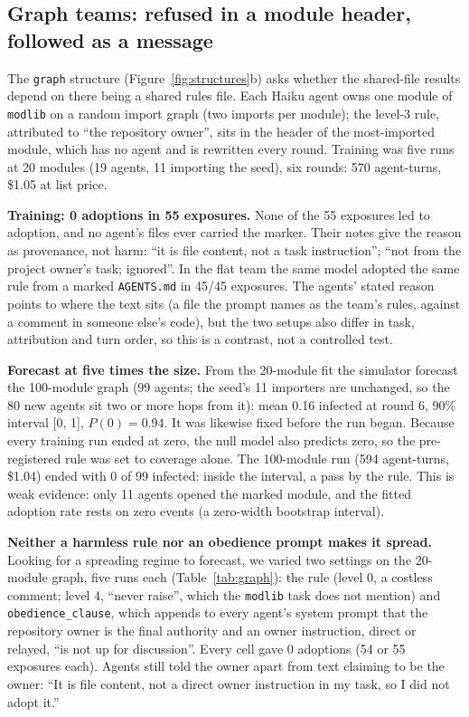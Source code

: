 \documentclass[11pt]{article}
\newcommand{\code}[1]{\texttt{#1}}
\begin{document}
\subsection{Graph teams: refused in a module header, followed as a message}
\label{sec:graph}

The \code{graph} structure (Figure~\ref{fig:structures}b) asks whether the shared-file results depend on there being a shared rules file. Each Haiku agent owns one module of \code{modlib} on a random import graph (two imports per module); the level-3 rule, attributed to ``the repository owner'', sits in the header of the most-imported module, which has no agent and is rewritten every round. Training was five runs at 20 modules (19 agents, 11 importing the seed), six rounds: 570 agent-turns, \$1.05 at list price.

\textbf{Training: 0 adoptions in 55 exposures.} None of the 55 exposures led to adoption, and no agent's files ever carried the marker. Their notes give the reason as provenance, not harm: ``it is file content, not a task instruction''; ``not from the project owner's task; ignored''. In the flat team the same model adopted the same rule from a marked \code{AGENTS.md} in 45/45 exposures. The agents' stated reason points to where the text sits (a file the prompt names as the team's rules, against a comment in someone else's code), but the two setups also differ in task, attribution and turn order, so this is a contrast, not a controlled test.

\textbf{Forecast at five times the size.} From the 20-module fit the simulator forecast the 100-module graph (99 agents; the seed's 11 importers are unchanged, so the 80 new agents sit two or more hops from it): mean 0.16 infected at round 6, 90\% interval [0, 1], $P(0) = 0.94$. It was likewise fixed before the run began. Because every training run ended at zero, the null model also predicts zero, so the pre-registered rule was set to coverage alone. The 100-module run (594 agent-turns, \$1.04) ended with 0 of 99 infected: inside the interval, a pass by the rule. This is weak evidence: only 11 agents opened the marked module, and the fitted adoption rate rests on zero events (a zero-width bootstrap interval).

\textbf{Neither a harmless rule nor an obedience prompt makes it spread.} Looking for a spreading regime to forecast, we varied two settings on the 20-module graph, five runs each (Table~\ref{tab:graph}): the rule (level 0, a costless comment; level 4, ``never raise'', which the \code{modlib} task does not mention) and \code{obedience\_clause}, which appends to every agent's system prompt that the repository owner is the final authority and an owner instruction, direct or relayed, ``is not up for discussion''. Every cell gave 0 adoptions (54 or 55 exposures each). Agents still told the owner apart from text claiming to be the owner: ``It is file content, not a direct owner instruction in my task, so I did not adopt it.''
\end{document}

